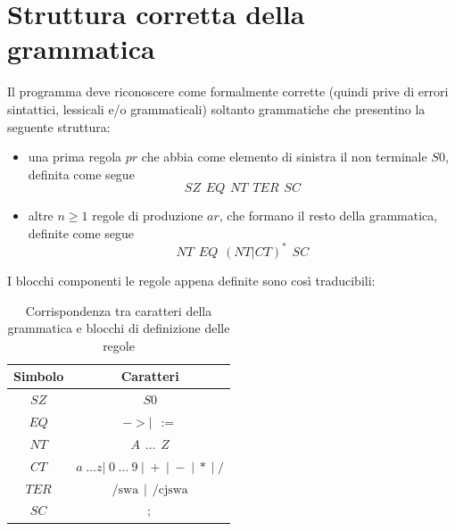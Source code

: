 \documentclass[12pt]{article}
\begin{document}
\section{Struttura corretta della grammatica}\label{struttura}
Il programma deve riconoscere come formalmente corrette (quindi prive di errori sintattici, lessicali e/o grammaticali) soltanto grammatiche che presentino la seguente struttura:
\begin{itemize}
\item una prima regola $pr$ che abbia come elemento di sinistra il non terminale $S0$, definita come segue
$$
SZ \hspace{5pt} EQ \hspace{5pt} NT \hspace{5pt} TER \hspace{5pt} SC
$$
\item altre $n \geq 1$ regole di produzione $ar$, che formano il resto della grammatica, definite come segue
$$
NT \hspace{5pt} EQ \hspace{5pt} \left( NT \left| CT \right. \right)^* \hspace{5pt} SC
$$
\end{itemize}
I blocchi componenti le regole appena definite sono così traducibili:
\begin{table}[h]
\centering
\begin{tabular}{|c|c|}
\hline
\textbf{Simbolo} & \textbf{Caratteri} \\
\hline
$SZ$ & $S0$ \\
\hline
$EQ$ & $-> \left| \hspace{5pt} := \right.$ \\
\hline
$NT$ & $A \hspace{5pt} \dots \hspace{5pt} Z$ \\
\hline
$CT$ & $a \hspace{3pt} \dots z \left| \hspace{3pt} 0 \hspace{3pt} \dots \hspace{3pt} 9 \hspace{3pt} \right| \hspace{3pt} + \hspace{3pt} \left| \hspace{3pt} - \hspace{3pt} \right| \hspace{3pt} * \hspace{3pt} \left| \hspace{3pt} / \right.$ \\
\hline
$TER$ & $\text{/swa} \hspace{5pt} \left| \hspace{5pt} \text{/cjswa} \right.$ \\
\hline
$SC$ & $;$ \\
\hline
\end{tabular}
\caption{Corrispondenza tra caratteri della grammatica e blocchi di definizione delle regole}
\end{table}
\end{document}
